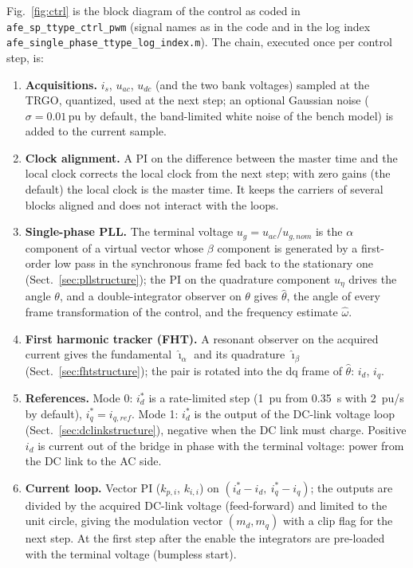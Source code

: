 \documentclass[10pt,a4paper]{scrartcl}
\newcommand{\kpi}{k_{p,i}}
\newcommand{\kii}{k_{i,i}}
\newcommand{\pu}{\,\mathrm{pu}}
\newcommand{\code}[1]{\texttt{#1}}
\newcommand{\ihat}{\hat{\imath}}
\begin{document}
\begin{onehalfspace}
Fig.~\ref{fig:ctrl} is the block diagram of the control as coded in \code{afe\_sp\_ttype\_ctrl\_pwm} (signal names as in the code and in the log index \code{afe\_single\_phase\_ttype\_log\_index.m}). The chain, executed once per control step, is:
\begin{enumerate}
\item \textbf{Acquisitions.} $i_s$, $u_{ac}$, $u_{dc}$ (and the two bank voltages) sampled at the TRGO, quantized, used at the next step; an optional Gaussian noise ($\sigma = 0.01\pu$ by default, the band-limited white noise of the bench model) is added to the current sample.
\item \textbf{Clock alignment.} A PI on the difference between the master time and the local clock corrects the local clock from the next step; with zero gains (the default) the local clock is the master time. It keeps the carriers of several blocks aligned and does not interact with the loops.
\item \textbf{Single-phase PLL.} The terminal voltage $u_g = u_{ac}/u_{g,nom}$ is the $\alpha$ component of a virtual vector whose $\beta$ component is generated by a first-order low pass in the synchronous frame fed back to the stationary one (Sect.~\ref{sec:pllstructure}); the PI on the quadrature component $u_\eta$ drives the angle $\theta$, and a double-integrator observer on $\theta$ gives $\hat\theta$, the angle of every frame transformation of the control, and the frequency estimate $\hat\omega$.
\item \textbf{First harmonic tracker (FHT).} A resonant observer on the acquired current gives the fundamental $\ihat_\alpha$ and its quadrature $\ihat_\beta$ (Sect.~\ref{sec:fhtstructure}); the pair is rotated into the dq frame of $\hat\theta$: $i_d$, $i_q$.
\item \textbf{References.} Mode 0: $i_d^*$ is a rate-limited step (\SI{1}{pu} from \SI{0.35}{s} with \SI{2}{pu/s} by default), $i_q^* = i_{q,ref}$. Mode 1: $i_d^*$ is the output of the DC-link voltage loop (Sect.~\ref{sec:dclinkstructure}), negative when the DC link must charge. Positive $i_d$ is current out of the bridge in phase with the terminal voltage: power from the DC link to the AC side.
\item \textbf{Current loop.} Vector PI ($\kpi$, $\kii$) on $(i_d^* - i_d,\ i_q^* - i_q)$; the outputs are divided by the acquired DC-link voltage (feed-forward) and limited to the unit circle, giving the modulation vector $(m_d, m_q)$ with a clip flag for the next step. At the first step after the enable the integrators are pre-loaded with the terminal voltage (bumpless start).

\end{enumerate}
\end{onehalfspace}
\end{document}

